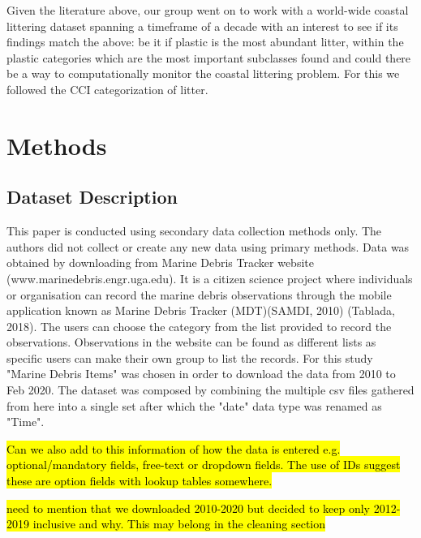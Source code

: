 \documentclass[10pt]{article}\usepackage[]{graphicx}\usepackage[]{color}
\begin{document}
Given the literature above, our group went on to work with a world-wide coastal littering dataset spanning a timeframe of a decade with an interest to see if its findings match the above: be it if plastic is the most abundant litter, within the plastic categories which are the most important subclasses found and could there be a way to computationally monitor the coastal littering problem. For this we followed the CCI categorization of litter.



\pagebreak
\section {Methods}\label{methods}

\subsection{Dataset Description}\label{dataset}

This paper is conducted using secondary data collection methods only. The authors did not collect or create any new data using primary methods. Data was obtained by downloading from Marine Debris Tracker website (www.marinedebris.engr.uga.edu). It is a citizen science project where individuals or organisation can record the marine debris observations through the mobile application known as Marine Debris Tracker (MDT)(SAMDI, 2010) (Tablada, 2018). The users can choose the category from the list provided to record the observations. Observations in the website can be found as different lists as specific users can make their own group to list the records. For this study "Marine Debris Items" was chosen in order to download the data from 2010 to Feb 2020. The dataset was composed by combining the multiple csv files gathered from here into a single set after which the  "date" data type was renamed as "Time".

\hl{Can we also add to this information of how the data is entered e.g. optional/mandatory fields, free-text or dropdown fields. The use of IDs suggest these are option fields with lookup tables somewhere.}

\hl{need to mention that we downloaded 2010-2020 but decided to keep only 2012-2019 inclusive and why. This may belong in the cleaning section}
\end{document}
